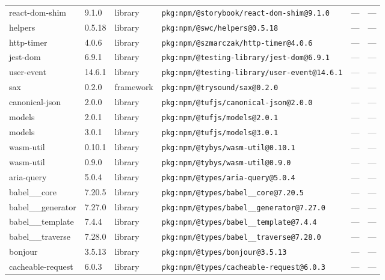 \documentclass[11pt,a4paper]{article}
\begin{document}
\begin{longtable}{|p{4cm}|p{2cm}|p{1.6cm}|p{5cm}|p{1.5cm}|p{3.5cm}|}
\raggedright react-dom-shim & 9.1.0 & library & \small\texttt{pkg:npm/@storybook/react-dom-shim@9.1.0} & — & \small — \\
\raggedright helpers & 0.5.18 & library & \small\texttt{pkg:npm/@swc/helpers@0.5.18} & — & \small — \\
\raggedright http-timer & 4.0.6 & library & \small\texttt{pkg:npm/@szmarczak/http-timer@4.0.6} & — & \small — \\
\raggedright jest-dom & 6.9.1 & library & \small\texttt{pkg:npm/@testing-library/jest-dom@6.9.1} & — & \small — \\
\raggedright user-event & 14.6.1 & library & \small\texttt{pkg:npm/@testing-library/user-event@14.6.1} & — & \small — \\
\raggedright sax & 0.2.0 & framework & \small\texttt{pkg:npm/@trysound/sax@0.2.0} & — & \small — \\
\raggedright canonical-json & 2.0.0 & library & \small\texttt{pkg:npm/@tufjs/canonical-json@2.0.0} & — & \small — \\
\raggedright models & 2.0.1 & library & \small\texttt{pkg:npm/@tufjs/models@2.0.1} & — & \small — \\
\raggedright models & 3.0.1 & library & \small\texttt{pkg:npm/@tufjs/models@3.0.1} & — & \small — \\
\raggedright wasm-util & 0.10.1 & library & \small\texttt{pkg:npm/@tybys/wasm-util@0.10.1} & — & \small — \\
\raggedright wasm-util & 0.9.0 & library & \small\texttt{pkg:npm/@tybys/wasm-util@0.9.0} & — & \small — \\
\raggedright aria-query & 5.0.4 & library & \small\texttt{pkg:npm/@types/aria-query@5.0.4} & — & \small — \\
\raggedright babel\_\_core & 7.20.5 & library & \small\texttt{pkg:npm/@types/babel\_\_core@7.20.5} & — & \small — \\
\raggedright babel\_\_generator & 7.27.0 & library & \small\texttt{pkg:npm/@types/babel\_\_generator@7.27.0} & — & \small — \\
\raggedright babel\_\_template & 7.4.4 & library & \small\texttt{pkg:npm/@types/babel\_\_template@7.4.4} & — & \small — \\
\raggedright babel\_\_traverse & 7.28.0 & library & \small\texttt{pkg:npm/@types/babel\_\_traverse@7.28.0} & — & \small — \\
\raggedright bonjour & 3.5.13 & library & \small\texttt{pkg:npm/@types/bonjour@3.5.13} & — & \small — \\
\raggedright cacheable-request & 6.0.3 & library & \small\texttt{pkg:npm/@types/cacheable-request@6.0.3} & — & \small — \\

\end{longtable}
\end{document}
